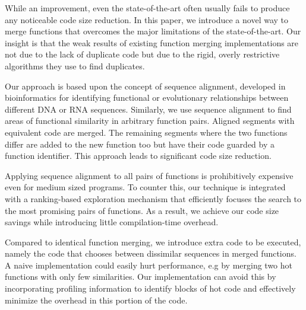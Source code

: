 While an improvement, even the state-of-the-art often usually fails to produce any
noticeable code size reduction. In this paper, we introduce a novel way to merge
functions that overcomes the major limitations of the state-of-the-art. Our
insight is that the weak results of existing function merging implementations
are not due to the lack of duplicate code but due to the rigid, overly restrictive
algorithms they use to find duplicates.

Our approach is based upon the concept of sequence alignment, developed in
bioinformatics for identifying functional or evolutionary relationships between
different DNA or RNA sequences. Similarly, we use sequence alignment to find
areas of functional similarity in arbitrary function pairs. Aligned segments
with equivalent code are merged. The remaining segments where the two functions
differ are added to the new function too but have their code guarded by a
function identifier. This approach leads to significant code size reduction.

Applying sequence alignment to all pairs of functions is prohibitively expensive
even for medium sized programs. To counter this, our technique is integrated with
a ranking-based exploration mechanism that efficiently focuses the search to the most
promising pairs of functions. %
As a result, we achieve our code size savings while introducing little compilation-time
overhead.

Compared to identical function merging, we introduce extra code to be executed,
namely the code that chooses between dissimilar sequences in merged functions.
A naive implementation could easily hurt performance, e.g by merging two hot functions
with only few similarities. Our implementation can avoid this by incorporating
profiling information to identify blocks of hot code and effectively minimize 
the overhead in this portion of the code.

